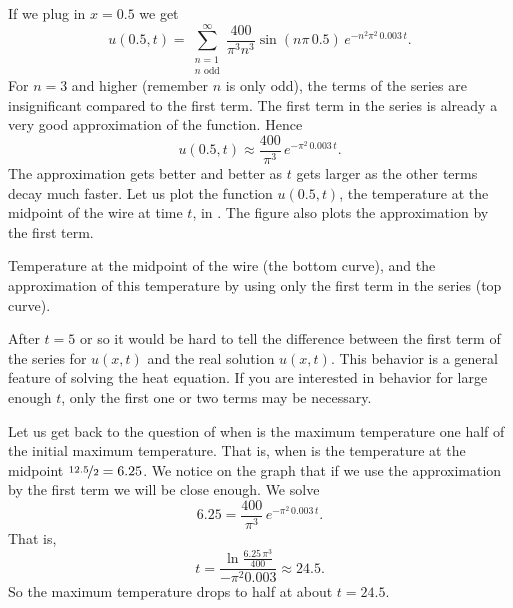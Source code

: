 \begin{example}
If we plug in $x=0.5$ we get
\begin{equation*}
u(0.5,t) = 
\sum_{\substack{n=1 \\ n \text{ odd}}}^\infty
\frac{400}{\pi^3 n^3}
\sin (n \pi\, 0.5 )
\, e^{-n^2 \pi^2 \, 0.003 \, t} .
\end{equation*}
For $n=3$ and higher (remember $n$ is only odd), the terms
of the series
are insignificant compared to the first term.
The first term in the series is already a very good approximation
of the function.  
Hence 
\begin{equation*}
u(0.5,t) \approx
\frac{400}{\pi^3}
\, e^{-\pi^2 \, 0.003 \, t} .
\end{equation*}
The approximation gets better and better as $t$ gets larger as the other
terms decay much faster.
Let us plot the function $u(0.5,t)$, the temperature at the midpoint of the wire
at time $t$, in .  The figure also
plots the approximation by the first term.

\begin{myfig}
\capstart
{}
\caption{Temperature at the midpoint of the wire (the bottom curve),
and the approximation of this temperature by using only the first term in
the series (top curve).\label{heat:wireexmaxfig}}
\end{myfig}

After $t=5$ or so
it would be hard to tell the difference
between the first term of the series for $u(x,t)$ and 
the real solution $u(x,t)$.  This behavior
is a general feature of solving the heat equation.
If you are interested in behavior for large enough $t$, only the
first one or two terms may be necessary.

Let us
get back to the question of when is the maximum temperature one half of the
initial maximum temperature.  That is, when is the temperature
at the midpoint $\nicefrac{12.5}{2} = 6.25$.  We notice on the graph that if we use
the approximation by the first term we will be close enough.  We
solve
\begin{equation*}
6.25 =
\frac{400}{\pi^3}
\, e^{-\pi^2 \, 0.003 \, t} .
\end{equation*}
That is,
\begin{equation*}
t =
\frac{\ln \frac{6.25\,\pi^3}{400}}{-\pi^2 0.003}
\approx 24.5 .
\end{equation*}
So the maximum temperature drops to half at about $t=24.5$.
\end{example}

